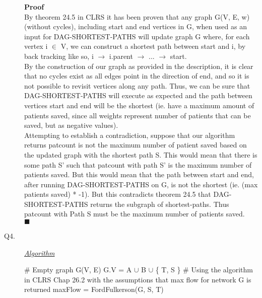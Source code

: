\documentclass[10pt]{csc_assignment}
\begin{document}
\begin{description}
\textbf{Proof}\\
By theorem 24.5 in CLRS it has been proven that any graph G(V, E, w) (without cycles), including start and end vertices in G, when used as an input for DAG-SHORTEST-PATHS will update graph G where, for each vertex i $\in$ V, we can construct a shortest path between start and i, by back tracking like so, i $\rightarrow$ i.parent $\rightarrow$ ... $\rightarrow$ start.\\
By the construction of our graph as provided in the description, it is clear that no cycles exist as all edges point in the direction of end, and so it is not possible to revisit vertices along any path. Thus, we can be sure that DAG-SHORTEST-PATHS will execute as expected and the path between vertices start and end will be the shortest (ie. have a maximum amount of patients saved, since all weights represent number of patients that can be saved, but as negative values).\\
Attempting to establish a contradiction, suppose that our algorithm returns patcount is not the maximum number of patient saved based on the updated graph with the shortest path S. This would mean that there is some path S' such that patcount with path S' is the maximum number of patients saved. But this would mean that the path between start and end, after running DAG-SHORTEST-PATHS on G, is not the shortest (ie. (max patients saved) * -1). But this contradicts theorem 24.5 that DAG-SHORTEST-PATHS returns the subgraph of shortest-paths. Thus patcount with Path S must be the maximum number of patients saved.\\
$\blacksquare$\\


\newpage
\item[Q4.]

\emph{\underline{Algorithm}}\\
\begin{algorithm}[H]
 \LinesNumbered 
 \# Empty graph\;
 G(V, E)\;
 G.V = A $\cup$ B $\cup$ \{ T, S \} \;
  \# Using the algorithm in CLRS Chap 26.2 with the assumptions that max flow for network G is returned\;
 maxFlow = FordFulkerson(G, S, T)\;
 

\end{algorithm}
\end{description}
\end{document}
